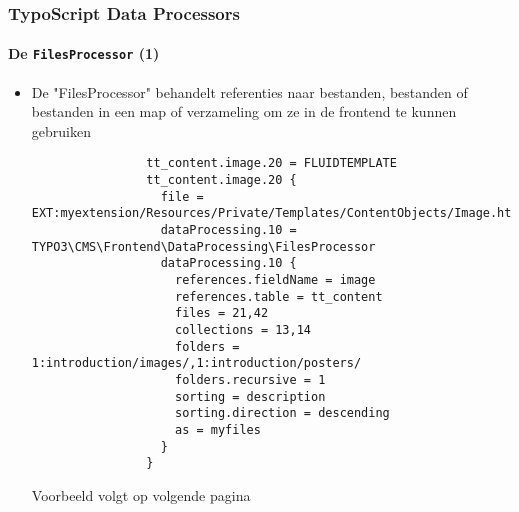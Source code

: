 
\begin{frame}[fragile]
	\frametitle{TypoScript Data Processors}
	\framesubtitle{De \texttt{FilesProcessor} (1)}

	\lstset{basicstyle=\tiny\ttfamily}

	\begin{itemize}

		\item De "FilesProcessor" behandelt referenties naar bestanden, bestanden of bestanden in een map of verzameling
			om ze in de frontend te kunnen gebruiken

			\begin{lstlisting}
				tt_content.image.20 = FLUIDTEMPLATE
				tt_content.image.20 {
				  file = EXT:myextension/Resources/Private/Templates/ContentObjects/Image.html
				  dataProcessing.10 = TYPO3\CMS\Frontend\DataProcessing\FilesProcessor
				  dataProcessing.10 {
				    references.fieldName = image
				    references.table = tt_content
				    files = 21,42
				    collections = 13,14
				    folders = 1:introduction/images/,1:introduction/posters/
				    folders.recursive = 1
				    sorting = description
				    sorting.direction = descending
				    as = myfiles
				  }
				}
			\end{lstlisting}

			\small
				Voorbeeld volgt op volgende pagina
			\normalsize

	\end{itemize}

\end{frame}


